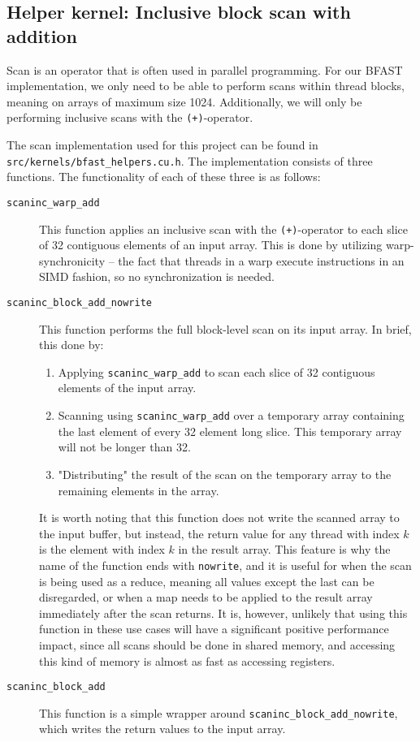 \subsection{
  Helper kernel: Inclusive block scan with addition
}

Scan is an operator that is often used in parallel programming.
For our BFAST implementation, we only need to be able to perform scans within
thread blocks, meaning on arrays of maximum size 1024.
Additionally, we will only be performing inclusive scans with the
\texttt{(+)}-operator.

The scan implementation used for this project can be found in
\texttt{src/kernels/bfast\_helpers.cu.h}.
The implementation consists of three functions.
The functionality of each of these three is as follows:
\begin{description}
\item[\texttt{scaninc\_warp\_add}]
This function applies an inclusive scan with the \texttt{(+)}-operator to each
slice of 32 contiguous elements of an input array.
This is done by utilizing warp-synchronicity -- the fact that threads in a warp
execute instructions in an SIMD fashion, so no synchronization is needed.
\item[\texttt{scaninc\_block\_add\_nowrite}]
This function performs the full block-level scan on its input array.
In brief, this done by:
\begin{enumerate}
\item
  Applying \texttt{scaninc\_warp\_add} to scan each slice of 32 contiguous
  elements of the input array.
\item
  Scanning using \texttt{scaninc\_warp\_add} over a temporary array containing
  the last element of every 32 element long slice.
  This temporary array will not be longer than 32.
\item
  "Distributing" the result of the scan on the temporary array to the remaining
  elements in the array. %
\end{enumerate}
It is worth noting that this function does not write the scanned array to the
input buffer, but instead, the return value for any thread with index \(k\) is
the element with index \(k\) in the result array.
This feature is why the name of the function ends with \texttt{nowrite}, and it
is useful for when the scan is being used as a reduce, meaning all values
except the last can be disregarded, or when a map needs to be applied to the
result array immediately after the scan returns. %
It is, however, unlikely that using this function in these use cases will have
a significant positive performance impact, since all scans should be done in
shared memory, and accessing this kind of memory is almost as fast as accessing
registers.
\item[\texttt{scaninc\_block\_add}]
This function is a simple wrapper around \texttt{scaninc\_block\_add\_nowrite},
which writes the return values to the input array.
\end{description}


